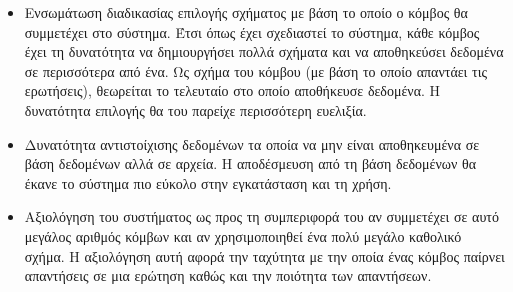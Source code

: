 \begin{itemize}
\item Ενσωμάτωση διαδικασίας επιλογής σχήματος με βάση το οποίο ο
κόμβος θα συμμετέχει στο σύστημα. Έτσι όπως έχει σχεδιαστεί το
σύστημα, κάθε κόμβος έχει τη δυνατότητα να δημιουργήσει πολλά
σχήματα και να αποθηκεύσει δεδομένα σε περισσότερα από ένα. Ως
σχήμα του κόμβου (με βάση το οποίο απαντάει τις ερωτήσεις),
θεωρείται το τελευταίο στο οποίο αποθήκευσε δεδομένα. Η δυνατότητα
επιλογής θα του παρείχε περισσότερη ευελιξία.
\item Δυνατότητα αντιστοίχισης δεδομένων τα οποία να μην είναι
αποθηκευμένα σε βάση δεδομένων αλλά σε αρχεία. Η αποδέσμευση από
τη βάση δεδομένων θα έκανε το σύστημα πιο εύκολο στην εγκατάσταση
και τη χρήση.
\item Αξιολόγηση του συστήματος ως προς τη συμπεριφορά του αν
συμμετέχει σε αυτό μεγάλος αριθμός κόμβων  και αν χρησιμοποιηθεί ένα πολύ μεγάλο καθολικό σχήμα. H
αξιολόγηση αυτή αφορά την ταχύτητα με την οποία ένας κόμβος
παίρνει απαντήσεις σε μια ερώτηση καθώς και την ποιότητα των
απαντήσεων.
\end{itemize}